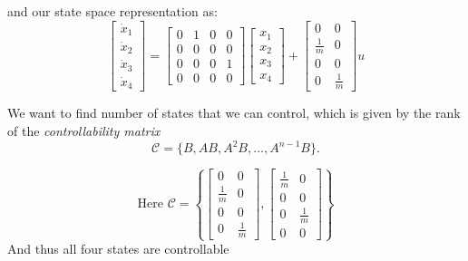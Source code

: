 and our state space representation as:
\begin{equation}
\begin{bmatrix}
\dot{x}_1\\ 
\dot{x}_2\\
\dot{x}_3\\
\dot{x}_4
\end{bmatrix} = \begin{bmatrix}
0 & 1 & 0 & 0 \\
0 & 0 & 0 & 0\\
0 & 0 & 0 & 1\\
0 & 0 & 0 & 0
\end{bmatrix}  \begin{bmatrix}
x_1\\
x_2\\
x_3\\
x_4
\end{bmatrix} + \begin{bmatrix}
0 & 0 \\
\frac{1}{m} & 0 \\
0 & 0 \\
0 & \frac{1}{m}
\end{bmatrix} u
\end{equation}

We want to find number of states that we can control, which is given by the rank of the \emph{controllability matrix}
\begin{equation}
\mathcal{C} = \{ B, AB, A^2B, ... , A^{n-1}B \}.
\end{equation}

\begin{equation}
\textrm{Here }
\mathcal{C}=\left\{
\begin{bmatrix} 
0 & 0\\
\frac{1}{m} & 0 \\
0 & 0 \\
0 & \frac{1}{m}
\end{bmatrix}
,
\begin{bmatrix} 
\frac{1}{m}& 0\\
0 & 0\\
0 & \frac{1}{m}\\
0 & 0
\end{bmatrix}
 \right\}
\end{equation}
And thus all four states are controllable

